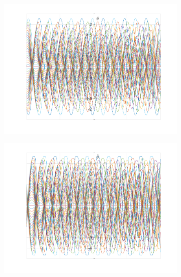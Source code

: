\documentclass{article}
\begin{document}
	\begin{figure}[h!]
		\centering
		\begin{subfigure}[b]{0.48\linewidth}
			\includegraphics[width=\linewidth]{./SmallOscillations/Chaotic/F1.png}
		\end{subfigure}
		\begin{subfigure}[b]{0.48\linewidth}
			\includegraphics[width=\linewidth]{./SmallOscillations/Chaotic/F2.png}
		\end{subfigure}
	\end{figure}
\end{document}
